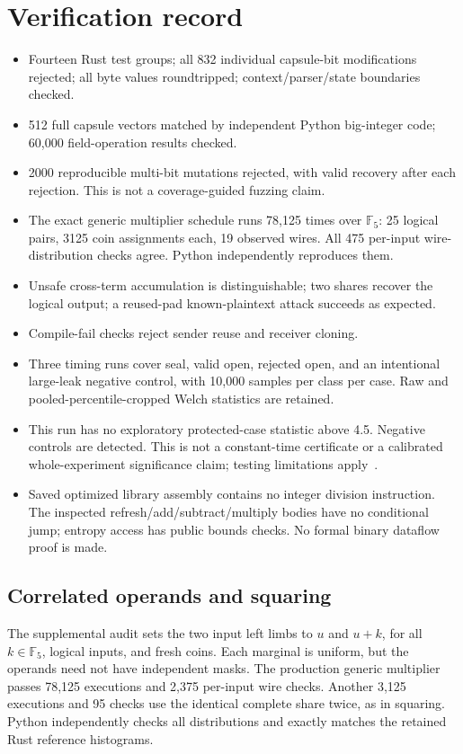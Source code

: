 \documentclass[11pt]{article}
\begin{document}
\section{Verification record}
\begin{itemize}
\item Fourteen Rust test groups; all 832 individual capsule-bit modifications
rejected; all byte values roundtripped; context/parser/state boundaries checked.
\item 512 full capsule vectors matched by independent Python big-integer code;
60,000 field-operation results checked.
\item 2000 reproducible multi-bit mutations rejected, with valid recovery after
each rejection. This is not a coverage-guided fuzzing claim.
\item The exact generic multiplier schedule runs 78,125 times over $\mathbb F_5$:
25 logical pairs, 3125 coin assignments each, 19 observed wires. All 475
per-input wire-distribution checks agree. Python independently reproduces them.
\item Unsafe cross-term accumulation is distinguishable; two shares recover the
logical output; a reused-pad known-plaintext attack succeeds as expected.
\item Compile-fail checks reject sender reuse and receiver cloning.
\item Three timing runs cover seal, valid open, rejected open, and an intentional
large-leak negative control, with 10,000 samples per class per case.
Raw and pooled-percentile-cropped Welch statistics are retained.
\item This run has no exploratory protected-case statistic above 4.5. Negative
controls are detected. This is not a constant-time certificate or a calibrated
whole-experiment significance claim; testing limitations apply~\cite{dudect}.
\item Saved optimized library assembly contains no integer division instruction.
The inspected refresh/add/subtract/multiply bodies have no conditional jump;
entropy access has public bounds checks. No formal binary dataflow proof is made.
\end{itemize}

\subsection{Correlated operands and squaring}
The supplemental audit sets the two input left limbs to $u$ and $u+k$,
for all $k\in\mathbb F_5$, logical inputs, and fresh coins. Each marginal is
uniform, but the operands need not have independent masks. The production
generic multiplier passes 78,125 executions and 2,375 per-input wire checks.
Another 3,125 executions and 95 checks use the identical complete share twice,
as in squaring. Python independently checks all distributions and exactly
matches the retained Rust reference histograms.
\end{document}
